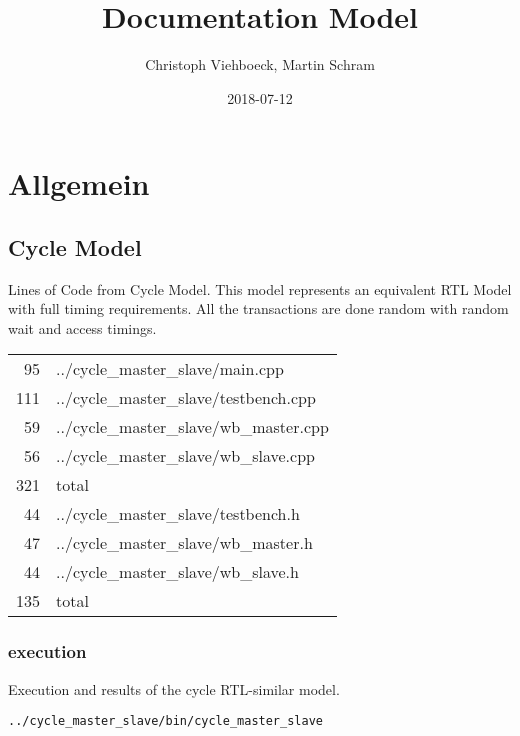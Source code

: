\documentclass[11pt]{article}
\author{Christoph Viehboeck, Martin Schram}
\date{2018-07-12}
\title{Documentation Model}
\begin{document}
\maketitle

\section{Allgemein}
\label{sec:org3bb1837}

\subsection{Cycle Model}
\label{sec:org36a478c}
Lines of Code from Cycle Model. This model represents an equivalent
RTL Model with full timing requirements. All the transactions are done
random with random wait and access timings.

\begin{center}
\begin{tabular}{rl}
95 & ../cycle\_master\_slave/main.cpp\\
111 & ../cycle\_master\_slave/testbench.cpp\\
59 & ../cycle\_master\_slave/wb\_master.cpp\\
56 & ../cycle\_master\_slave/wb\_slave.cpp\\
321 & total\\
44 & ../cycle\_master\_slave/testbench.h\\
47 & ../cycle\_master\_slave/wb\_master.h\\
44 & ../cycle\_master\_slave/wb\_slave.h\\
135 & total\\
\end{tabular}
\end{center}

\subsubsection{execution}
\label{sec:org65770ac}
Execution and results of the cycle RTL-similar model.

\lstset{language=shell,label= ,caption= ,captionpos=b,numbers=none}
\begin{lstlisting}
../cycle_master_slave/bin/cycle_master_slave
\end{lstlisting}
\end{document}
